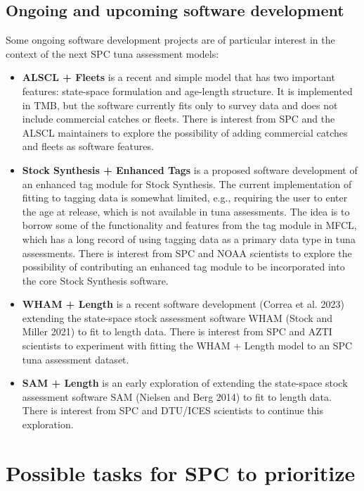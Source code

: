 \documentclass{SCreport}
\begin{document}
\subsection{Ongoing and upcoming software development}

Some ongoing software development projects are of particular interest in the
context of the next SPC tuna assessment models:

\begin{itemize}
  \item \textbf{ALSCL + Fleets} is a recent and simple model that has two
  important features: state-space formulation and age-length structure. It is
  implemented in TMB, but the software currently fits only to survey data and
  does not include commercial catches or fleets. There is interest from SPC and
  the ALSCL maintainers to explore the possibility of adding commercial catches
  and fleets as software features.
  \item \textbf{Stock Synthesis + Enhanced Tags} is a proposed software
  development of an enhanced tag module for Stock Synthesis. The current
  implementation of fitting to tagging data is somewhat limited, e.g., requiring
  the user to enter the age at release, which is not available in tuna
  assessments. The idea is to borrow some of the functionality and features from
  the tag module in MFCL, which has a long record of using tagging data as a
  primary data type in tuna assessments. There is interest from SPC and NOAA
  scientists to explore the possibility of contributing an enhanced tag module
  to be incorporated into the core Stock Synthesis software.
  \item \textbf{WHAM + Length} is a recent software development (Correa et al.
  2023) extending the state-space stock assessment software WHAM (Stock and
  Miller 2021) to fit to length data. There is interest from SPC and AZTI
  scientists to experiment with fitting the WHAM + Length model to an SPC tuna
  assessment dataset.
  \item \textbf{SAM + Length} is an early exploration of extending the
  state-space stock assessment software SAM (Nielsen and Berg 2014) to fit to
  length data. There is interest from SPC and DTU/ICES scientists to continue
  this exploration.
\end{itemize}

\section{Possible tasks for SPC to prioritize}
\end{document}
